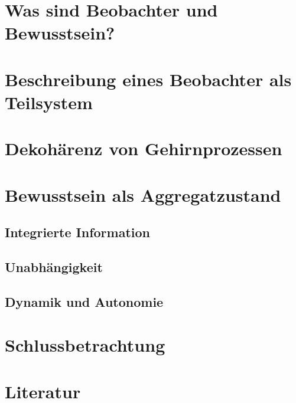 
\pagestyle{empty}
\newcommand{\Quote}[1]{\enquote{\emph{#1}}}

	
	\section{Was sind Beobachter und Bewusstsein?}
	
	\section{Beschreibung eines Beobachter als Teilsystem}
	
	\section{Dekohärenz von Gehirnprozessen}
	
	\section{Bewusstsein als Aggregatzustand}
	
		\subsection{Integrierte Information}
		
		\subsection{Unabhängigkeit}
		
		\subsection{Dynamik und Autonomie}
		
	\section{Schlussbetrachtung}
	
	
	\section{Literatur}
	\printbibliography
